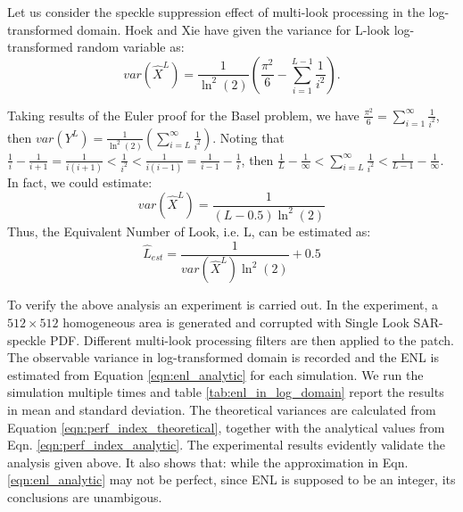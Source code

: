 \documentclass[journal]{IEEEtran}
\begin{document}
Let us consider the speckle suppression effect of multi-look processing in the log-transformed domain. 
Hoek \cite{Hoekman_1991_TGRS} and Xie \cite{Xie_2002_TGRS} have given the variance for L-look log-transformed random variable as: 
\begin{equation}
var(\hat{X}^L)= \frac{1}{\ln^2(2)} \left( \frac{\pi^2}{6} - \sum^{L-1}_{i=1}{\frac{1}{i^2}} \right).
\label{eqn:perf_index_theoretical}
\end{equation}

Taking results of the Euler proof for the Basel problem, we have $\frac{\pi^2}{6} = \sum^{\infty}_{i=1}{ \frac{1}{i^2} } $, then $var(Y^L)= \frac{1}{\ln^2(2)} \left( \sum^{\infty}_{i=L}{ \frac{1}{i^2} } \right) $.
Noting that $ \frac{1}{i} - \frac{1}{i+1} = \frac{1}{i(i+1)} < \frac{1}{i^2} < \frac{1}{i(i-1)} = \frac{1}{i-1} - \frac{1}{i}$, then $ \frac{1}{L} - \frac{1}{\infty} < \sum^{\infty}_{i=L}{ \frac{1}{i^2} }  < \frac{1}{L-1} - \frac{1}{\infty} $.
In fact, we could estimate:
\begin{equation}
  var(\hat{X}^L) = \frac{1}{(L-0.5) \ln^2(2) }
\label{eqn:perf_index_analytic}
\end{equation}
Thus, the Equivalent Number of Look, i.e. L, can be estimated as:
\begin{equation}
\hat{L}_{est} = \frac{1}{var(\hat{X}^L) \ln^2(2)} + 0.5
\label{eqn:enl_analytic}
\end{equation}

To verify the above analysis an experiment is carried out.
In the experiment, a $512\times512$ homogeneous area is generated and corrupted with Single Look SAR-speckle PDF. 
Different multi-look processing filters are then applied to the patch. 
The observable variance in log-transformed domain is recorded and 
	the ENL is estimated from Equation \ref{eqn:enl_analytic} for each simulation.
We run the simulation multiple times and table \ref{tab:enl_in_log_domain} report the results in mean and standard deviation.
The theoretical variances are calculated from Equation \ref{eqn:perf_index_theoretical}, 
	together with the analytical values from Eqn. \ref{eqn:perf_index_analytic}.
The experimental results evidently validate the analysis given above.
It also shows that: 
	while the approximation in Eqn. \ref{eqn:enl_analytic} may not be perfect, 
	since ENL is supposed to be an integer, its conclusions are unambigous.
\end{document}
